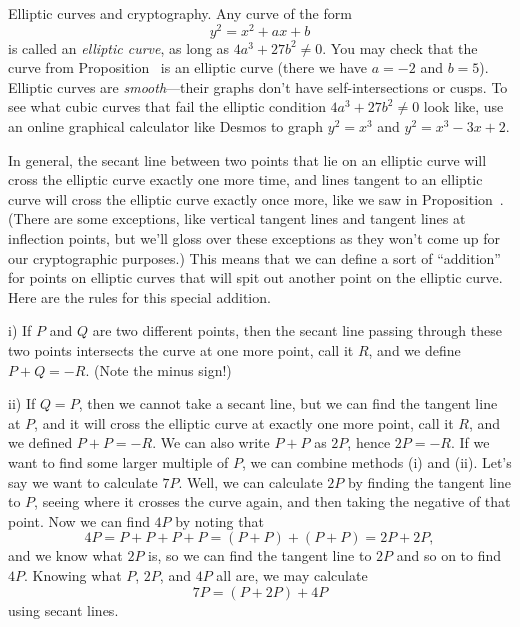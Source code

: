 \medskip\boldlabel \llap{*}Elliptic curves and cryptography.
Any curve of the form
$$y^2 = x^2 + ax + b$$
is called an {\it elliptic curve}, as long as $4a^3 + 27b^2\ne 0$. You may check that the curve from
Proposition~{\propelliptic} is an elliptic curve (there we have $a=-2$ and $b=5$). Elliptic curves
are {\it smooth}---their graphs don't have self-intersections or cusps. To see what cubic curves that
fail the elliptic condition $4a^3 + 27b^2 \ne 0$ look like,
use an online graphical calculator like Desmos to graph $y^2 = x^3$ and $y^2 = x^3 -3x + 2$.

In general, the
secant line between two points that lie on an elliptic curve will cross the elliptic curve exactly
one more time, and lines tangent to an elliptic curve will cross the elliptic curve exactly once more,
like we saw in Proposition~{\propelliptic}. (There are some exceptions, like vertical tangent lines and
tangent lines at inflection points, but we'll gloss over these exceptions as they won't come up for
our cryptographic purposes.) This means that we can define a sort of ``addition'' for points on elliptic
curves that will spit out another point on the elliptic curve. Here are the rules for this special addition.
\medskip
\item{i)} If $P$ and $Q$ are two different points, then
the secant line passing through these two points intersects the curve at one more point, call it $R$, and
we define $P+Q = -R$. (Note the minus sign!)
\smallskip
\item{ii)} If $Q = P$, then we cannot take a secant line, but we can find the tangent line at $P$, and
it will cross the elliptic curve at exactly one more point, call it $R$, and we defined $P+P=-R$.
We can also write $P+P$ as $2 P$, hence $2P=-R$.
\medskip
If we want to find some larger multiple of $P$, we can combine methods (i) and (ii). Let's say we want
to calculate $7P$. Well, we can calculate $2 P$ by finding the tangent line to $P$, seeing where
it crosses the curve again, and then taking the negative of that point. Now we can find $4 P$
by noting that
$$4P = P+P+P+P = (P+P) + (P+P) = 2P + 2P,$$
and we know what $2P$ is, so we can find the tangent line to $2P$ and so on to find $4P$. Knowing
what $P$, $2P$, and $4P$ all are, we may calculate
$$7P = (P + 2P) + 4P$$
using secant lines.

